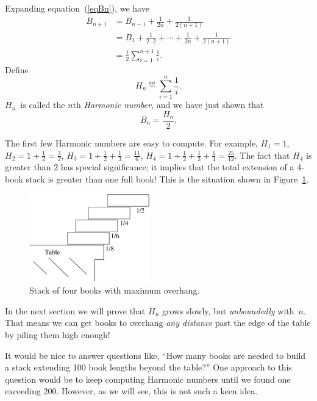 Expanding equation~(\ref{eqBn}), we have
\begin{align*}
B_{n+1} & = B_{n-1} + \frac{1}{2n} + \frac{1}{2(n+1)}\\
        & = B_1 + \frac{1}{2 \cdot 2} + \cdots + \frac{1}{2n} +
            \frac{1}{2(n+1)}\\
        & = \frac{1}{2}\sum_{i=1}^{n+1} \frac{1}{i}.
\end{align*}
Define
\[
H_n \eqdef \sum_{i=1}^n \frac{1}{i}.
\]
$H_n$~is called the $n$th \emph{Harmonic number}, and we have just shown
that
\[
B_n = \frac{H_n}{2}.
\]

The first few Harmonic numbers are easy to compute.  For example, $H_1
= 1$, $H_2 = 1 + \frac{1}{2} = \frac{3}{2}$, $H_3 = 1 + \frac{1}{2} +
\frac{1}{3} = \frac{11}{6}$, $H_4 = 1 + \frac{1}{2} + \frac{1}{3} +
\frac{1}{4} = \frac{25}{12}$.  The fact that $H_4$ is greater than 2 has
special significance; it implies that the total extension of a 4-book
stack is greater than one full book!  This is the situation shown in
Figure~\ref{fig:optstack}.

\begin{figure}[htbp]
\centerline{\includegraphics[height=1.5in]{figures/optstack}}
\caption{Stack of four books with maximum overhang.}
\label{fig:optstack}
\end{figure}

In the next section we will prove that $H_n$ grows slowly, but
\emph{unboundedly} with~$n$.  That means we can get books to overhang
\emph{any distance} past the edge of the table by piling them high enough!


It would be nice to answer questions like, ``How many books are needed
to build a stack extending 100 book lengths beyond the table?''  One
approach to this question would be to keep computing Harmonic numbers
until we found one exceeding 200.  However, as we will see, this is
not such a keen idea.

